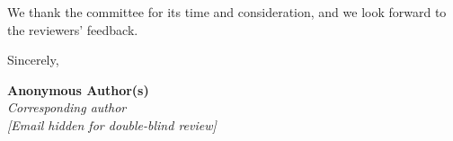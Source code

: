 \documentclass[11pt]{article}
\begin{document}
\bigskip

\noindent We thank the committee for its time and consideration, and we look forward to the reviewers' feedback.

\bigskip

\noindent Sincerely,

\vspace{0.6cm}

\noindent\textbf{Anonymous Author(s)}\\
\textit{Corresponding author}\\
\emph{[Email hidden for double-blind review]}
\end{document}
